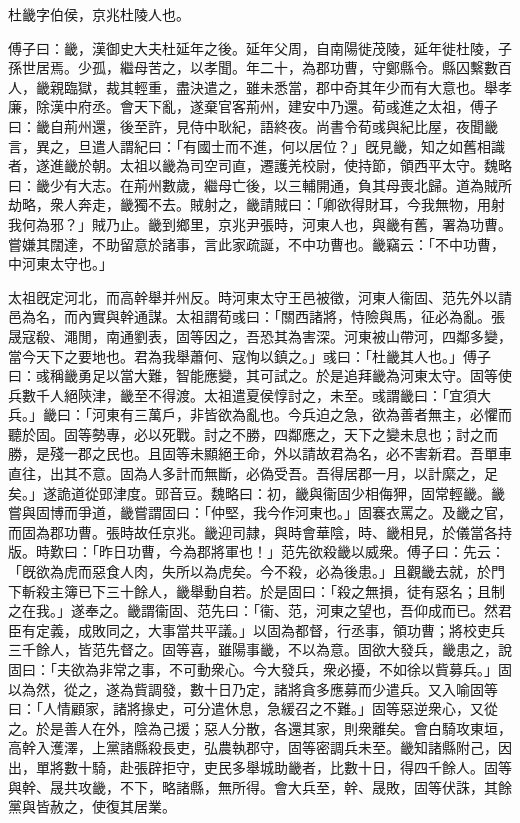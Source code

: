 
\begin{pinyinscope}
杜畿字伯侯，京兆杜陵人也。

傅子曰：畿，漢御史大夫杜延年之後。延年父周，自南陽徙茂陵，延年徙杜陵，子孫世居焉。少孤，繼母苦之，以孝聞。年二十，為郡功曹，守鄭縣令。縣囚繫數百人，畿親臨獄，裁其輕重，盡決遣之，雖未悉當，郡中奇其年少而有大意也。舉孝廉，除漢中府丞。會天下亂，遂棄官客荊州，建安中乃還。荀彧進之太祖，傅子曰：畿自荊州還，後至許，見侍中耿紀，語終夜。尚書令荀彧與紀比屋，夜聞畿言，異之，旦遣人謂紀曰：「有國士而不進，何以居位？」旣見畿，知之如舊相識者，遂進畿於朝。太祖以畿為司空司直，遷護羌校尉，使持節，領西平太守。魏略曰：畿少有大志。在荊州數歲，繼母亡後，以三輔開通，負其母喪北歸。道為賊所劫略，衆人奔走，畿獨不去。賊射之，畿請賊曰：「卿欲得財耳，今我無物，用射我何為邪？」賊乃止。畿到鄉里，京兆尹張時，河東人也，與畿有舊，署為功曹。嘗嫌其闊達，不助留意於諸事，言此家疏誕，不中功曹也。畿竊云：「不中功曹，中河東太守也。」

太祖旣定河北，而高幹舉并州反。時河東太守王邑被徵，河東人衞固、范先外以請邑為名，而內實與幹通謀。太祖謂荀彧曰：「關西諸將，恃險與馬，征必為亂。張晟寇殽、澠閒，南通劉表，固等因之，吾恐其為害深。河東被山帶河，四鄰多變，當今天下之要地也。君為我舉蕭何、寇恂以鎮之。」彧曰：「杜畿其人也。」傅子曰：彧稱畿勇足以當大難，智能應變，其可試之。於是追拜畿為河東太守。固等使兵數千人絕陝津，畿至不得渡。太祖遣夏侯惇討之，未至。彧謂畿曰：「宜須大兵。」畿曰：「河東有三萬戶，非皆欲為亂也。今兵迫之急，欲為善者無主，必懼而聽於固。固等勢專，必以死戰。討之不勝，四鄰應之，天下之變未息也；討之而勝，是殘一郡之民也。且固等未顯絕王命，外以請故君為名，必不害新君。吾單車直往，出其不意。固為人多計而無斷，必偽受吾。吾得居郡一月，以計縻之，足矣。」遂詭道從郖津度。郖音豆。魏略曰：初，畿與衞固少相侮狎，固常輕畿。畿嘗與固博而爭道，畿嘗謂固曰：「仲堅，我今作河東也。」固褰衣罵之。及畿之官，而固為郡功曹。張時故任京兆。畿迎司隷，與時會華陰，時、畿相見，於儀當各持版。時歎曰：「昨日功曹，今為郡將軍也！」范先欲殺畿以威衆。傅子曰：先云：「旣欲為虎而惡食人肉，失所以為虎矣。今不殺，必為後患。」且觀畿去就，於門下斬殺主簿已下三十餘人，畿舉動自若。於是固曰：「殺之無損，徒有惡名；且制之在我。」遂奉之。畿謂衞固、范先曰：「衞、范，河東之望也，吾仰成而已。然君臣有定義，成敗同之，大事當共平議。」以固為都督，行丞事，領功曹；將校吏兵三千餘人，皆范先督之。固等喜，雖陽事畿，不以為意。固欲大發兵，畿患之，說固曰：「夫欲為非常之事，不可動衆心。今大發兵，衆必擾，不如徐以貲募兵。」固以為然，從之，遂為貲調發，數十日乃定，諸將貪多應募而少遣兵。又入喻固等曰：「人情顧家，諸將掾史，可分遣休息，急緩召之不難。」固等惡逆衆心，又從之。於是善人在外，陰為己援；惡人分散，各還其家，則衆離矣。會白騎攻東垣，高幹入濩澤，上黨諸縣殺長吏，弘農執郡守，固等密調兵未至。畿知諸縣附己，因出，單將數十騎，赴張辟拒守，吏民多舉城助畿者，比數十日，得四千餘人。固等與幹、晟共攻畿，不下，略諸縣，無所得。會大兵至，幹、晟敗，固等伏誅，其餘黨與皆赦之，使復其居業。


\end{pinyinscope}
